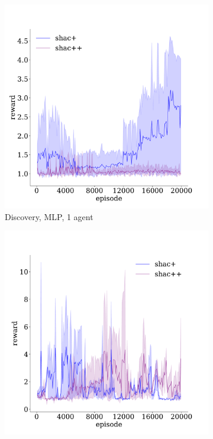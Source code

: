 \begin{figure}[!t]
    \begin{subfigure}[b]{0.32\textwidth}
        \includegraphics[width=\textwidth]{figs/discovery-ablation-1-mlp.pdf}
        \caption{Discovery, MLP, 1 agent}
        \label{fig:discovery-ablation-mlp-1}
    \end{subfigure}
    \begin{subfigure}[b]{0.32\textwidth}
        \includegraphics[width=\textwidth]{figs/discovery-ablation-3-transformer.pdf}

\end{subfigure}
\end{figure}

